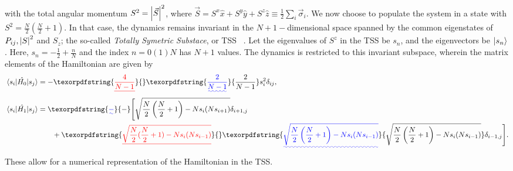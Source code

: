 \documentclass[%
reprint,
superscriptaddress,
amsmath,amssymb,
aps,
prb,
showkeys,
]{revtex4-2}
\providecommand{\DIFaddtex}[1]{{\protect\color{blue}\uwave{#1}}} %
\providecommand{\DIFdeltex}[1]{{\protect\color{red}\sout{#1}}}                      %
\providecommand{\DIFaddbegin}{} %
\providecommand{\DIFaddend}{} %
\providecommand{\DIFdelbegin}{} %
\providecommand{\DIFdelend}{} %
\providecommand{\DIFadd}[1]{\texorpdfstring{\DIFaddtex{#1}}{#1}} %
\providecommand{\DIFdel}[1]{\texorpdfstring{\DIFdeltex{#1}}{}} %
\newcommand{\DIFscaledelfig}{0.5}
\newlength{\DIFdelgraphicswidth} %
\newlength{\DIFdelgraphicsheight} %
\newcommand{\DIFaddincludegraphics}[2][]{{\color{blue}\fbox{\DIFOincludegraphics[#1]{#2}}}} %
\newcommand{\DIFdelincludegraphics}[2][]{%
\sbox{\DIFdelgraphicsbox}{\DIFOincludegraphics[#1]{#2}}%
\settoboxwidth{\DIFdelgraphicswidth}{\DIFdelgraphicsbox} %
\settoboxtotalheight{\DIFdelgraphicsheight}{\DIFdelgraphicsbox} %
\scalebox{\DIFscaledelfig}{%
\parbox[b]{\DIFdelgraphicswidth}{\usebox{\DIFdelgraphicsbox}\\[-\baselineskip] \rule{\DIFdelgraphicswidth}{0em}}\llap{\resizebox{\DIFdelgraphicswidth}{\DIFdelgraphicsheight}{%
\setlength{\unitlength}{\DIFdelgraphicswidth}%
\begin{picture}(1,1)%
\thicklines\linethickness{2pt} %
{\color[rgb]{1,0,0}\put(0,0){\framebox(1,1){}}}%
{\color[rgb]{1,0,0}\put(0,0){\line( 1,1){1}}}%
{\color[rgb]{1,0,0}\put(0,1){\line(1,-1){1}}}%
\end{picture}%
}\hspace*{3pt}}} %
} %
\DeclareRobustCommand{\DIFaddbegin}{\DIFOaddbegin \let\includegraphics\DIFaddincludegraphics} %
\DeclareRobustCommand{\DIFaddend}{\DIFOaddend \let\includegraphics\DIFOincludegraphics} %
\DeclareRobustCommand{\DIFdelbegin}{\DIFOdelbegin \let\includegraphics\DIFdelincludegraphics} %
\DeclareRobustCommand{\DIFdelend}{\DIFOaddend \let\includegraphics\DIFOincludegraphics} %
\begin{document}
with the total angular momentum $S^2 = \abs{\vec{S}}^2$, where \DIFdelbegin \DIFdel{$\vec{S}=S^x\hat{x}+S^y\hat{y}+S^z\hat{z}\equiv\frac{1}{2} \sum_i \vec{\sigma}_i$}\DIFdelend \DIFaddbegin \DIFadd{$\vec{S_i}=\frac{1}{2} \sum_i \vec{\sigma}_i$}\DIFaddend . We now choose to populate the system in a state with $S^2=\displaystyle\frac{N}{2}\left(\frac{N}{2}+1\right)$. In that case, the dynamics remains invariant in the  $N+1-$dimensional space spanned by the common eigenstates of \DIFdelbegin \DIFdel{$P_{ij}, \abs{S}^2$ }\DIFdelend \DIFaddbegin \DIFadd{$P_{ij} \equiv \displaystyle\frac{1}{2}\left(1+ \vec{\sigma}_i\cdot\vec{\sigma}_j\right), \abs{S}^2$ }\DIFaddend and $S_z$; the so-called \textit{ Totally Symetric Substace}, or TSS ~\cite{mori_prethermalization_2019}. Let the eigenvalues of $S^z$ in the TSS be $s_n$, and the eigenvectors be $\ket{s_n}$. Here, $s_n=-\frac{1}{2}+\frac{n}{N}$ and the index
$n= 0 (1) N$ has $N+1$ values. The dynamics is restricted to this invariant subspace, wherein the matrix elements of the Hamiltonian are given by
\begin{align}
	\mel{s_i}{\hat{H_0}}{s_j} &= -\DIFdelbegin \DIFdel{\frac{4}{N-1} }\DIFdelend \DIFaddbegin \DIFadd{\frac{2}{N-1} }\DIFaddend s^2_i \delta_{ij},\nonumber\\
	\mel{s_i}{\hat{H_1}}{s_j} &= \DIFaddbegin \DIFadd{-}\DIFaddend \Bigg[\sqrt{\frac{N}{2}\left(\frac{N}{2}+1\right) - Ns_i(Ns_{i + 1})}\delta_{i+1, j} \nonumber\\ 
	&\hskip 0.7cm +\DIFdelbegin \DIFdel{\sqrt{\frac{N}{2}(\frac{N}{2}+1) - Ns_i(Ns_{i- 1})}}\DIFdelend \DIFaddbegin \DIFadd{\sqrt{\frac{N}{2}\left(\frac{N}{2}+1\right) - Ns_i(Ns_{i- 1})}}\DIFaddend \delta_{i-1,j}\Bigg].
	\label{eq:lmg:tssham}
\end{align}
These allow for a numerical representation of the Hamiltonian in the TSS.
\end{document}
